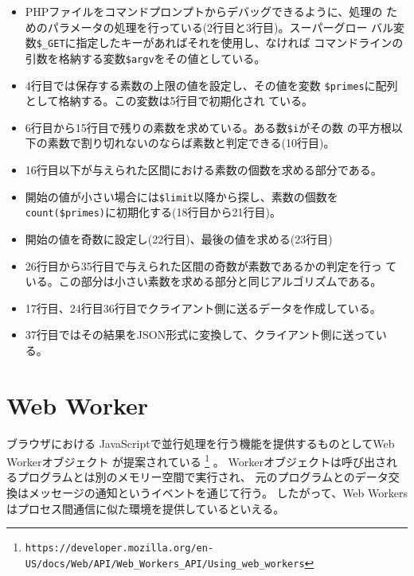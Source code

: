 \begin{Exec}
 \begin{itemize}
  \item PHPファイルをコマンドプロンプトからデバッグできるように、処理の
        ためのパラメータの処理を行っている(2行目と3行目)。スーパーグロー
        バル変数\Verb+$_GET+に指定したキーがあればそれを使用し、なければ
        コマンドラインの引数を格納する変数\Verb+$argv+をその値としている。
  \item 4行目では保存する素数の上限の値を設定し、その値を変数
        \Verb+$primes+に配列として格納する。この変数は5行目で初期化され
        ている。
  \item 6行目から15行目で残りの素数を求めている。ある数\Verb+$i+がその数
        の平方根以下の素数で割り切れないのならば素数と判定できる(10行目)。
  \item 16行目以下が与えられた区間における素数の個数を求める部分である。
  \item 開始の値が小さい場合には\Verb+$limit+以降から探し、素数の個数を
        \Verb+count($primes)+に初期化する(18行目から21行目)。
  \item 開始の値を奇数に設定し(22行目)、最後の値を求める(23行目)
  \item 26行目から35行目で与えられた区間の奇数が素数であるかの判定を行っ
        ている。この部分は小さい素数を求める部分と同じアルゴリズムである。
  \item 17行目、24行目36行目でクライアント側に送るデータを作成している。
  \item 37行目ではその結果をJSON形式に変換して、クライアント側に送ってい
        る。
 \end{itemize}
\end{Exec}
\section{Web Worker}

ブラウザにおける
JavaScriptで並行処理を行う機能を提供するものとしてWeb Workerオブジェクト
が提案されている
\footnote{\texttt{https://developer.mozilla.org/en-US/docs/Web/API/Web\_Workers\_API/Using\_web\_workers}\label{webworkers}}
。
Workerオブジェクトは呼び出されるプログラムとは別のメモリー空間で実行され、
元のプログラムとのデータ交換はメッセージの通知というイベントを通じて行う。
したがって、Web Workers はプロセス間通信に似た環境を提供しているといえる。

